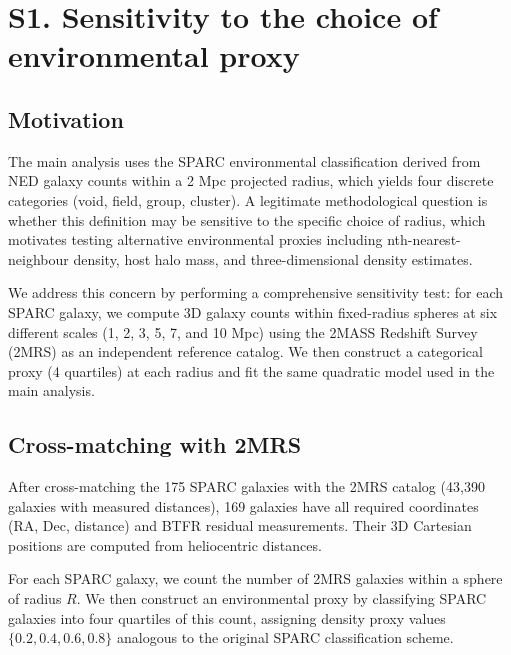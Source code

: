 
\section*{S1. Sensitivity to the choice of environmental proxy}
\label{sec:S1}

\subsection*{Motivation}

The main analysis uses the SPARC environmental classification derived from
NED galaxy counts within a 2 Mpc projected radius, which yields four
discrete categories (void, field, group, cluster). A legitimate
methodological question is whether this
definition may be sensitive to the specific choice of radius, which
motivates testing alternative environmental proxies including
nth-nearest-neighbour density, host halo mass, and three-dimensional
density estimates.

We address this concern by performing a comprehensive sensitivity test:
for each SPARC galaxy, we compute 3D galaxy counts within fixed-radius
spheres at six different scales (1, 2, 3, 5, 7, and 10 Mpc) using the
2MASS Redshift Survey (2MRS) as an independent reference catalog. We
then construct a categorical proxy (4 quartiles) at each radius and fit
the same quadratic model used in the main analysis.

\subsection*{Cross-matching with 2MRS}

After cross-matching the 175 SPARC galaxies with the 2MRS catalog
(43{,}390 galaxies with measured distances), 169 galaxies have all required
coordinates (RA, Dec, distance) and BTFR residual measurements. Their
3D Cartesian positions are computed from heliocentric distances.

For each SPARC galaxy, we count the number of 2MRS galaxies within
a sphere of radius $R$. We then construct an environmental proxy by
classifying SPARC galaxies into four quartiles of this count, assigning
density proxy values $\{0.2, 0.4, 0.6, 0.8\}$ analogous to the original
SPARC classification scheme.

